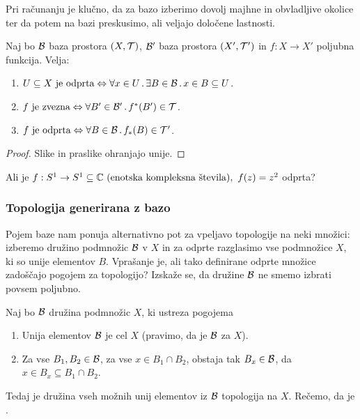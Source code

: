 Pri računanju je klučno, da za bazo izberimo dovolj majhne in obvladljive okolice ter da potem na bazi preskusimo, ali veljajo določene lastnosti.

\begin{trditev}
    Naj bo $\mathcal{B}$ baza prostora $(X, \mathcal{T})$, $\mathcal{B}'$ baza prostora $(X', \mathcal{T}')$ in $f: X \to X'$ poljubna funkcija. Velja:
    \begin{enumerate}
        \item $U \subseteq X \text{ je odprta} \Leftrightarrow \forall x \in U \,.\, \exists B \in \mathcal{B} \,.\, x \in B \subseteq U$.
        \item $f \text{ je zvezna} \Leftrightarrow \forall B' \in \mathcal{B}' \,.\, f^{*}(B') \in \mathcal{T}$.
        \item $f \text{ je odprta} \Leftrightarrow \forall B \in \mathcal{B} \,.\, f_{*}(B) \in \mathcal{T}'$.
    \end{enumerate}
\end{trditev}

\begin{proof}
    Slike in praslike ohranjajo unije.
\end{proof}

\begin{primer}
    Ali je $f: S^1 \to S^1 \subseteq \mathbb{C} \text{ (enotska kompleksna števila)}, \ f(z) = z^2$ odprta?
\end{primer}

\subsubsection{Topologija generirana z bazo}

Pojem baze nam ponuja alternativno pot za vpeljavo topologije na neki množici: izberemo družino podmnožic $\mathcal{B}$ v $X$ in za odprte razglasimo vse podmnožice $X$, ki so unije elementov $B$. Vprašanje je, ali tako definirane odprte množice zadoščajo pogojem za topologijo? Izskaže se, da družine $\mathcal{B}$ ne smemo izbrati povsem poljubno.

\begin{trditev}
    \label{trd:baza}
    Naj bo $\mathcal{B}$ družina podmnožic $X$, ki ustreza pogojema
    \begin{enumerate}
        \item Unija elementov $\mathcal{B}$ je cel $X$ (pravimo, da je $\mathcal{B}$  za $X$).
        \item Za vse $B_1, B_2 \in \mathcal{B}$, za vse $x \in B_1 \cap B_2$, obstaja tak $B_x \in \mathcal{B}$, da $x \in B_x \subseteq B_1 \cap B_2$.
    \end{enumerate} 
    Tedaj je družina vseh možnih unij elementov iz $\mathcal{B}$ topologija na $X$.     
    Rečemo, da je .
\end{trditev}

